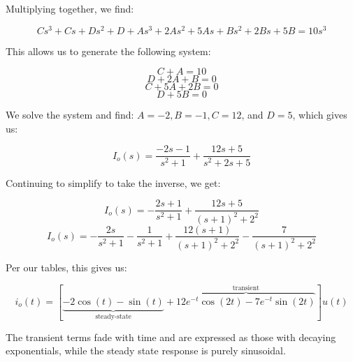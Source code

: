 \begin{enumerate}
\begin{enumerate}
        Multiplying together, we find:

        $$Cs^3+Cs+Ds^2+D+As^3+2As^2+5As+Bs^2+2Bs+5B=10s^3$$

        This allows us to generate the following system:

        $$C+A=10$$
        $$D+2A+B=0$$
        $$C+5A+2B=0$$
        $$D+5B=0$$

        We solve the system and find: $A=-2, B=-1, C=12$, and $D=5$, which gives us:

        $$I_o(s)=\frac{-2s-1}{s^2+1}+\frac{12s+5}{s^2+2s+5}$$

        Continuing to simplify to take the inverse, we get:

        $$I_o(s)=-\frac{2s+1}{s^2+1}+\frac{12s+5}{(s+1)^2+2^2}$$
        $$I_o(s)=-\frac{2s}{s^2+1}-\frac{1}{s^2+1}+\frac{12(s+1)}{(s+1)^2+2^2}-\frac{7}{(s+1)^2+2^2}$$

        Per our tables, this gives us:

        $$\boxed{i_o(t)=[\underbrace{-2\cos(t)-\sin(t)}_{\text{steady-state}}+\overbrace{12e^{-t}\cos(2t)-7e^{-t}\sin(2t)}^{\text{transient}}]u(t)}$$

        The transient terms fade with time and are expressed as those with decaying exponentials, while the steady state response is purely sinusoidal.

    \end{enumerate}

\end{enumerate}



